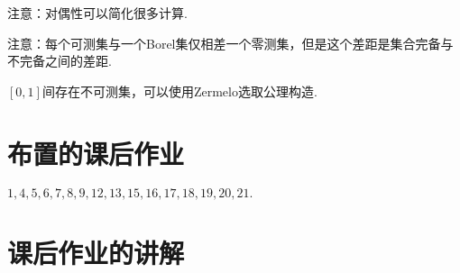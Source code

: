 \documentclass[bwprint, withoutpreface]{cumcmthesis}
\begin{document}
注意：对偶性可以简化很多计算.

注意：每个可测集与一个Borel集仅相差一个零测集，但是这个差距是集合完备与不完备之间的差距.

$[0, 1]$间存在不可测集，可以使用Zermelo选取公理构造.

\appendix
\section{布置的课后作业}
\indent $1,4,5,6,7,8,9,12,13,15,16,17,18,19,20,21.$

\section{课后作业的讲解}
\end{document}
